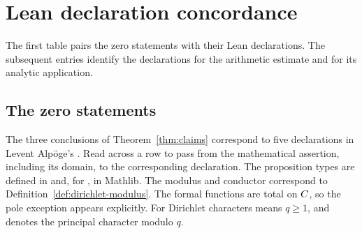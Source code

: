 \section{Lean declaration concordance}
\label{sec:lean-concordance}

The first table pairs the zero statements with their Lean declarations. The subsequent
entries identify the declarations for the arithmetic estimate and for its analytic
application.

\subsection{The zero statements}
\label{sec:lean-zero-statements}

The three conclusions of Theorem~\ref{thm:claims} correspond to five declarations
in Levent Alp\"oge's . Read across a row to pass from the mathematical assertion, including its domain, to
the corresponding declaration. The proposition types are defined in 
and, for , in Mathlib. The modulus and conductor correspond to Definition~\ref{def:dirichlet-modulus}.
The formal functions are
total on \(C\), so the pole exception appears explicitly. For Dirichlet
characters \code{[NeZero q]} means \(q\ge 1\), and  denotes the
principal character modulo \(q\).
\cite{release-claim-files,mathlib-rh-definition,sutherland-exports}

